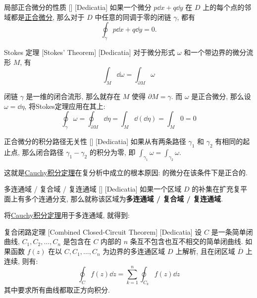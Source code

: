         \begin{ppt}
            {局部正合微分的性质}
            []
            [Dedicatia]
            如果一个微分 \(p\dd{x}+q\dd{y}\) 在 \(D\) 上的每个点的邻域都是\hyperref[dfn:Exact-Differential]{正合微分}, 那么对于 \(D\) 中任意的同调于零的闭链 \(\gamma\), 都有
            \[\oint_\gamma p\dd{x}+q\dd{y}=0.\]
        \end{ppt}

        \begin{thm}
            [Stokes]
            {Stokes 定理}
            [Stokes' Theorem]
            [Dedicatia]
            对于微分形式 \(\omega\) 和一个带边界的微分流形 \(M\), 有
            \[\int_{M} \dd\omega = \int_{\partial M} \omega\]
        \end{thm}

        闭链 \(\gamma\) 是一维的闭合流形, 那么就存在 \(M\) 使得 \(\partial M=\gamma\). 而 \(\omega\) 是正合微分, 那么设 \(\omega=\dd{\eta}\), 将Stokes定理应用在其上: 
        \[\oint_{\gamma} \omega = \oint_{\partial M} \dd\eta = \int_{M} \dd(\dd\eta) = \int_{M} 0 = 0\]
        
        \begin{ppt}
            {正合微分的积分路径无关性}
            []
            [Dedicatia]
            如果从有两条路径  \(\gamma_1\)  和  \(\gamma_2\) 有相同的起止点, 那么闭合路径  \(\gamma_1 - \gamma_2\)  的积分为零, 即  \(\int_{\gamma_1} \omega = \int_{\gamma_2} \omega\). 
        \end{ppt}

        这就是\hyperref[thm:Cauchy-Integral]{Cauchy积分定理}在复分析中成立的根本原因: \Holomorphic{} 的微分在该条件下是正合的. 

        \begin{dfn}
            {多连通域 / 复合域 / 复连通域}
            []
            [Dedicatia]
            如果一个区域 \(D\) 的补集在扩充复平面上有多个连通分支, 那么就称该区域为\textbf{多连通域 / 复合域 / 复连通域}.
        \end{dfn}

        将\hyperref[thm:Cauchy-Integral]{Cauchy积分定理}用于多连通域, 就得到: 

        \begin{thm}
            {复合闭路定理}
            [Combined Closed-Circuit Theorem]
            [Dedicatia]
            设  \(C\)  是一条简单闭曲线,  \(C_1, C_2, \ldots, C_n\)  是包含在  \(C\)  内部的  \(n\)  条互不包含也互不相交的简单闭曲线. 如果函数  \(f(z)\)  在以  \(C, C_1, \ldots, C_n\)  为边界的多连通区域 \(D\) 上解析, 且在闭区域  \(\overline{D}\)  上连续, 则有: 
            \[\oint_C f(z) \dd z = \sum_{k=1}^n \oint_{C_k} f(z) \dd z\]
            其中要求所有曲线都取正方向积分. 
        \end{thm}

